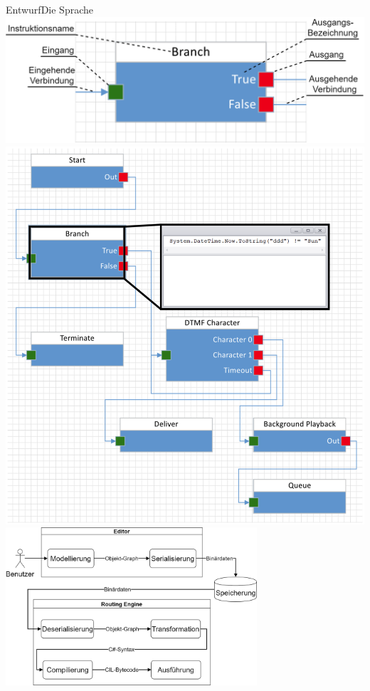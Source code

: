 \documentclass[t,aspectratio=169,divpsnames]{beamer}
\begin{document}
\begin{frame}{Entwurf}{Die Sprache}
	\only<1>
	{	
		\center
		\includegraphics[width=\textwidth]{img/SingleNodeWithAnnotations.png}
	}
	\only<2>
	{
		\center
		\includegraphics[scale=0.09]{img/ExampleFlowCodeHighlighted.png}
	}
	\only<3>
	{
		\center
		\includegraphics[width=0.7\textwidth]{img/Verarbeitungsschritte.png}
	}
\end{frame}
\end{document}
